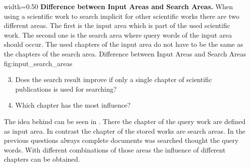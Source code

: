       {width=0.50\textwidth}
      {\textbf{Difference between Input Areas and Search Areas.} When using a scientific work to search implicit for other scientific works there are two different areas. The first is the input area which is part of the used scientific work. The second one is the search area where query words of the input area should occur. The used chapters of the input area do not have to be the same as the chapters of the search area.}
      {Difference between Input Areas and Search Areas}
      {fig:input_search_areas}

\begin{enumerate}[label=1.\arabic*]
  \setcounter{enumi}{2}
    \item Does the search result improve if only a single chapter of scientific publications is used for searching?
    \item Which chapter has the most influence?
\end{enumerate}

The idea behind can be seen in . There the chapter of the query work are defined as input area. In contrast the chapter of the stored works are search areas. In the previous questions always complete documents was searched thought the query words. With different combinations of those areas the influence of different chapters can be obtained.
